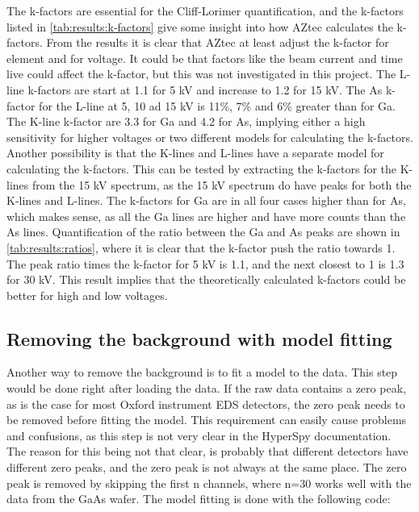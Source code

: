The k-factors are essential for the Cliff-Lorimer quantification, and the k-factors listed in \cref{tab:results:k-factors} give some insight into how AZtec calculates the k-factors.
From the results it is clear that AZtec at least adjust the k-factor for element and for voltage.
It could be that factors like the beam current and time live could affect the k-factor, but this was not investigated in this project.
The L-line k-factors are start at 1.1 for 5 kV and increase to 1.2 for 15 kV.
The As k-factor for the L-line at 5, 10 ad 15 kV is 11\%, 7\% and 6\% greater than for Ga.
The K-line k-factor are 3.3 for Ga and 4.2 for As, implying either a high sensitivity for higher voltages or two different models for calculating the k-factors.
Another possibility is that the K-lines and L-lines have a separate model for calculating the k-factors.
This can be tested by extracting the k-factors for the K-lines from the 15 kV spectrum, as the 15 kV spectrum do have peaks for both the K-lines and L-lines.
The k-factors for Ga are in all four cases higher than for As, which makes sense, as all the Ga lines are higher and have more counts than the As lines.
Quantification of the ratio between the Ga and As peaks are shown in \cref{tab:results:ratios}, where it is clear that the k-factor push the ratio towards 1.
The peak ratio times the k-factor for 5 kV is 1.1, and the next closest to 1 is 1.3 for 30 kV.
This result implies that the theoretically calculated k-factors could be better for high and low voltages.






\subsection{Removing the background with model fitting}
\label{sec:discussion:steps:model_fitting}
Another way to remove the background is to fit a model to the data.
This step would be done right after loading the data.
If the raw data contains a zero peak, as is the case for most Oxford instrument EDS detectors, the zero peak needs to be removed before fitting the model.
This requirement can easily cause problems and confusions, as this step is not very clear in the HyperSpy documentation.
The reason for this being not that clear, is probably that different detectors have different zero peaks, and the zero peak is not always at the same place.
The zero peak is removed by skipping the first n channels, where n=30 works well with the data from the GaAs wafer.
The model fitting is done with the following code:

